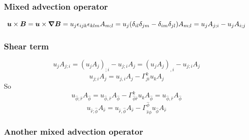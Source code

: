 \documentclass[\mydriver,12pt,twoside,notitlepage,a4paper]{article}
\renewcommand{\vec}[1]{\mbox{\boldmath{$#1$}}}
\newcommand{\Av}            {\vec{A}}
\newcommand{\Bv}            {\vec{B}}
\newcommand{\uv}            {\vec{u}}
\newcommand{\nab}{\mbox{\boldmath $\nabla$} {}}
\begin{document}
\subsubsection{Mixed advection operator}

\begin{equation}
\uv\times\Bv=\uv\times\nab\Bv
=u_j\epsilon_{ijk}\epsilon_{klm}A_{m;l}
=u_j(\delta_{il}\delta_{jm}-\delta_{im}\delta_{jl})A_{m;l}
=u_jA_{j;i}-u_jA_{i;j}
\end{equation}

\subsubsection{Shear term}

\begin{equation}
u_jA_{j;i}
=(u_jA_j)_{;i}-u_{j;i}A_j
=(u_jA_j)_{,i}-u_{j;i}A_j
\end{equation}
\begin{equation}
u_{j;i}A_j=u_{j,i}A_j-\Gamma^k_{ji}u_kA_j
\end{equation}
So
\begin{equation}
u_{\hat\phi;\hat r}A_{\hat\phi}
=u_{\hat\phi,\hat r}A_{\hat\phi}
-\Gamma^k_{\hat\phi\hat r}u_kA_{\hat\phi}
=u_{\hat\phi,\hat r}A_{\hat\phi}
\end{equation}
\begin{equation}
u_{\hat r;\hat\phi}A_{\hat r}
=u_{\hat r,\hat\phi}A_{\hat r}
-\Gamma^{\hat\phi}_{\hat r\hat\phi}u_{\hat\phi}A_{\hat r}
\end{equation}

\subsubsection{Another mixed advection operator}
\end{document}
